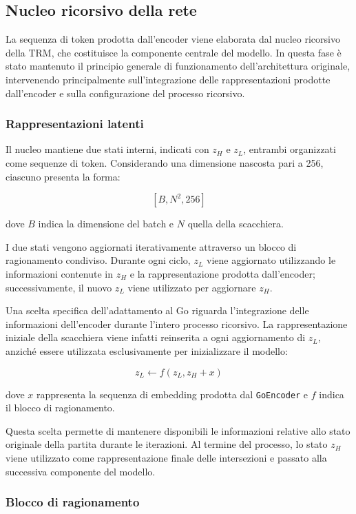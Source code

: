 \subsection{Nucleo ricorsivo della rete}

La sequenza di token prodotta dall'encoder viene elaborata dal nucleo ricorsivo della TRM, che costituisce la componente centrale del modello. In questa fase è stato mantenuto il principio generale di funzionamento dell'architettura originale, intervenendo principalmente sull'integrazione delle rappresentazioni prodotte dall'encoder e sulla configurazione del processo ricorsivo.

\subsubsection{Rappresentazioni latenti}

Il nucleo mantiene due stati interni, indicati con $z_H$ e $z_L$, entrambi organizzati come sequenze di token. Considerando una dimensione nascosta pari a 256, ciascuno presenta la forma:

\[
    [B, N^2, 256]
\]

dove $B$ indica la dimensione del batch e $N$ quella della scacchiera.

I due stati vengono aggiornati iterativamente attraverso un blocco di ragionamento condiviso. Durante ogni ciclo, $z_L$ viene aggiornato utilizzando le informazioni contenute in $z_H$ e la rappresentazione prodotta dall'encoder; successivamente, il nuovo $z_L$ viene utilizzato per aggiornare $z_H$.

Una scelta specifica dell'adattamento al Go riguarda l'integrazione delle informazioni dell'encoder durante l'intero processo ricorsivo. La rappresentazione iniziale della scacchiera viene infatti reinserita a ogni aggiornamento di $z_L$, anziché essere utilizzata esclusivamente per inizializzare il modello:

\[
    z_L \leftarrow f(z_L, z_H + x)
\]

dove $x$ rappresenta la sequenza di embedding prodotta dal \texttt{GoEncoder} e $f$ indica il blocco di ragionamento.

Questa scelta permette di mantenere disponibili le informazioni relative allo stato originale della partita durante le iterazioni. Al termine del processo, lo stato $z_H$ viene utilizzato come rappresentazione finale delle intersezioni e passato alla successiva componente del modello.

\subsubsection{Blocco di ragionamento}

